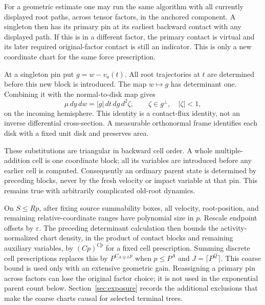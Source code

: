 \begin{remark}
\label{hist:coarse-chart}
For a geometric estimate one may run the same algorithm with all
currently displayed root paths, across tensor factors, in the anchored
component.  A singleton then has its primary pin at its earliest
backward contact with any displayed path.  If this is in a different
factor, the primary contact is virtual and its later required
original-factor contact is still an indicator.  This is only a new
coordinate chart for the same force prescription.

At a singleton pin put $g=w-v_a(t)$.  All root trajectories at $t$
are determined before this new block is introduced.  The map
$w\mapsto g$ has determinant one.  Combining it with the normal-to-disk
map gives
\begin{equation}
 \mu\,dy\,dw=|g|\,dt\,dg\,d^2\zeta,
 \qquad \zeta\in g^\perp,\quad |\zeta|<1,
 \label{eq:hist-disk-chart}
\end{equation}
on the incoming hemisphere.  This identity is a contact-flux identity,
not an inverse differential cross-section.  A measurable orthonormal
frame identifies each disk with a fixed unit disk and preserves area.

These substitutions are triangular in backward cell order.  A whole
multiple-addition cell is one coordinate block; all its variables are
introduced before any earlier cell is computed.  Consequently an
ordinary parent state is determined by preceding blocks, never by
the fresh velocity or impact variable at that pin.  This remains true
with arbitrarily complicated old-root dynamics.

On $S\leq Rp$, after fixing source summability boxes, all velocity,
root-position, and remaining relative-coordinate ranges have
polynomial size in $p$.  Rescale endpoint offsets by $\varepsilon$.
The preceding determinant calculation then bounds the activity-normalized
chart density, in the product of contact blocks and remaining auxiliary
variables, by $(Cp)^{Cp}$ for a fixed cell prescription.  Summing
discrete cell prescriptions replaces this by $P^{C_{A,Q,L}p}$ when
$p\leq P^A$ and $J=\lceil P^Q\rceil$.  This coarse bound is used only
with an extensive geometric gain.  Reassigning a primary pin across
factors can lose the original factor choice; it is not used in the
exponential parent count below.  Section~\ref{sec:exposure} records the
additional exclusions that make the coarse charts causal for selected
terminal trees.
\end{remark}

